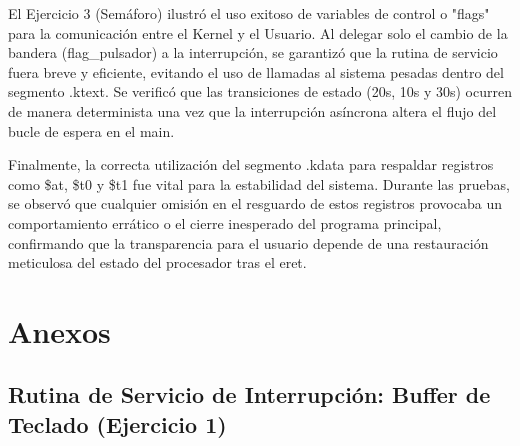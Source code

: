 \documentclass[12pt,a4paper]{article}
\begin{document}
El Ejercicio 3 (Semáforo) ilustró el uso exitoso de variables de control o "flags" para la comunicación entre el Kernel y el Usuario. Al delegar solo el cambio de la bandera (flag\_pulsador) a la interrupción, se garantizó que la rutina de servicio fuera breve y eficiente, evitando el uso de llamadas al sistema pesadas dentro del segmento .ktext. Se verificó que las transiciones de estado (20s, 10s y 30s) ocurren de manera determinista una vez que la interrupción asíncrona altera el flujo del bucle de espera en el main.

Finalmente, la correcta utilización del segmento .kdata para respaldar registros como \$at, \$t0 y \$t1 fue vital para la estabilidad del sistema. Durante las pruebas, se observó que cualquier omisión en el resguardo de estos registros provocaba un comportamiento errático o el cierre inesperado del programa principal, confirmando que la transparencia para el usuario depende de una restauración meticulosa del estado del procesador tras el eret.

\section{Anexos}

\subsection{Rutina de Servicio de Interrupción: Buffer de Teclado (Ejercicio 1)}
\end{document}
